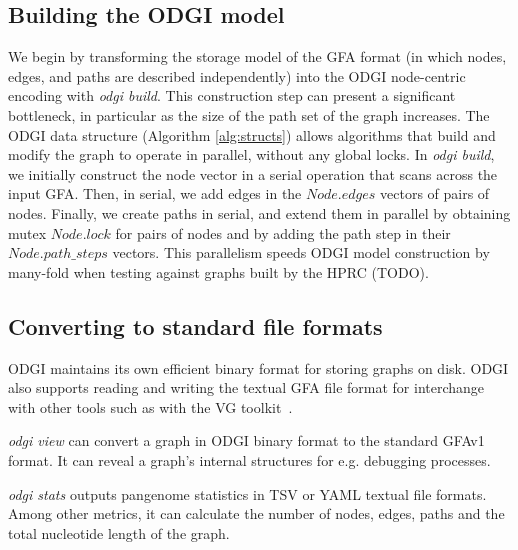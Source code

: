 \documentclass{bioinfo}
\begin{document}


\subsection{Building the \textsc{ODGI} model}
\label{sec:build}

We begin by transforming the storage model of the GFA format (in which nodes, edges, and paths are described independently) into the ODGI node-centric encoding with \textit{odgi build}.
This construction step can present a significant bottleneck, in particular as the size of the path set of the graph increases.
The ODGI data structure (Algorithm \ref{alg:structs}) allows algorithms that build and modify the graph to operate in parallel, without any global locks.
In \textit{odgi build}, we initially construct the node vector in a serial operation that scans across the input GFA. Then, in serial, we add edges in the $Node.edges$ vectors of pairs of nodes. Finally, we create paths in serial, and extend them in parallel by obtaining mutex $Node.lock$ for pairs of nodes and by adding the path step in their $Node.path\_steps$ vectors.
This parallelism speeds ODGI model construction by many-fold when testing against graphs built by the HPRC (TODO).


\subsection{Converting to standard file formats}
\label{sec:text}

ODGI maintains its own efficient binary format for storing graphs on disk.
ODGI also supports reading and writing the textual GFA file format for interchange with other tools such as with the VG toolkit~\citep{Garrison:2018}.

\textit{odgi view} can convert a graph in ODGI binary format to the standard GFAv1 format. It can reveal a graph’s internal structures for e.g. debugging processes.

\textit{odgi stats} outputs pangenome statistics in TSV or YAML textual file formats.
Among other metrics, it can calculate the number of nodes, edges, paths and the total nucleotide length of the graph.
\end{document}
